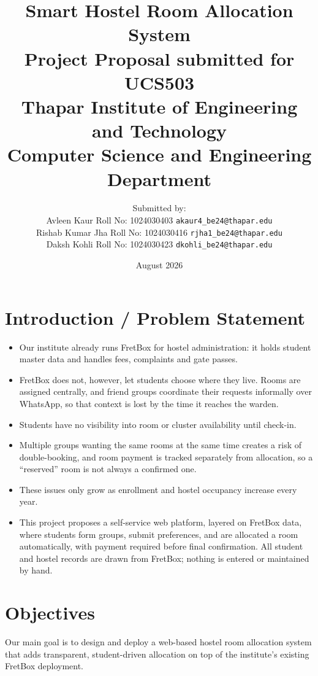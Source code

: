 \documentclass[11pt]{article}
\title{
    \vspace{-2cm}
    \textbf{\Large Smart Hostel Room Allocation System}\\[0.3cm]
    \large Project Proposal submitted for UCS503\\[0.3cm]
    Thapar Institute of Engineering and Technology\\
    Computer Science and Engineering Department
}
\author{
    Submitted by:\\
    Avleen Kaur \quad Roll No: 1024030403 \quad \texttt{akaur4\_be24@thapar.edu}\\
    Rishab Kumar Jha \quad Roll No: 1024030416 \quad \texttt{rjha1\_be24@thapar.edu}\\
    Daksh Kohli \quad Roll No: 1024030423 \quad \texttt{dkohli\_be24@thapar.edu}
}
\date{August 2026}
\begin{document}
\maketitle
\thispagestyle{fancy}

\section{Introduction / Problem Statement}
\begin{itemize}[leftmargin=1.2cm]
    \item Our institute already runs FretBox for hostel administration: it holds student master data and handles fees, complaints and gate passes.
    \item FretBox does not, however, let students choose where they live. Rooms are assigned centrally, and friend groups coordinate their requests informally over WhatsApp, so that context is lost by the time it reaches the warden.
    \item Students have no visibility into room or cluster availability until check-in.
    \item Multiple groups wanting the same rooms at the same time creates a risk of double-booking, and room payment is tracked separately from allocation, so a ``reserved'' room is not always a confirmed one.
    \item These issues only grow as enrollment and hostel occupancy increase every year.
    \item This project proposes a self-service web platform, layered on FretBox data, where students form groups, submit preferences, and are allocated a room automatically, with payment required before final confirmation. All student and hostel records are drawn from FretBox; nothing is entered or maintained by hand.
\end{itemize}

\section{Objectives}
Our main goal is to design and deploy a web-based hostel room allocation system that adds
transparent, student-driven allocation on top of the institute's existing FretBox deployment.
\end{document}
